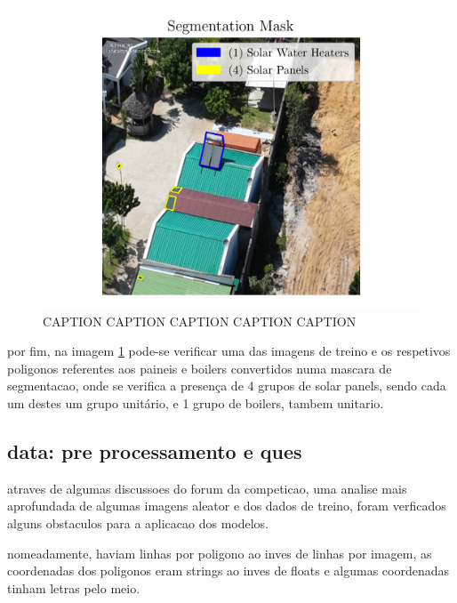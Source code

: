 \documentclass[conference]{IEEEtran}
\begin{document}

\begin{figure}[H]
    \centering
    \includegraphics[width=1\linewidth]{assets/data_segmentation_mask.png}
    \caption{CAPTION CAPTION CAPTION CAPTION CAPTION}
    \label{fig:data_segmentation_mask}
\end{figure}

por fim, na imagem \ref{fig:data_segmentation_mask} pode-se verificar uma das imagens de treino e os respetivos poligonos referentes aos paineis e boilers convertidos numa mascara de segmentacao, onde se verifica a presença de 4 grupos de solar panels, sendo cada um destes um grupo unitário, e 1 grupo de boilers, tambem unitario.


\subsection{data: pre processamento e ques}

atraves de algumas discussoes do forum da competicao, uma analise mais aprofundada de algumas imagens aleator e dos dados de treino, foram verficados alguns obstaculos para a aplicacao dos modelos.

nomeadamente, haviam linhas por poligono ao inves de linhas por imagem, as coordenadas dos poligonos eram strings ao inves de floats e algumas coordenadas tinham letras pelo meio.
\end{document}
